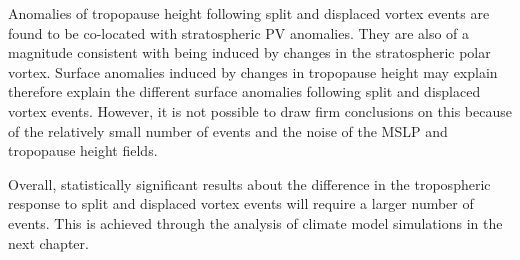 Anomalies of tropopause height following split and displaced vortex events are
found to be co-located with stratospheric PV anomalies. They are also of a
magnitude consistent with being induced by changes in the stratospheric polar
vortex. Surface anomalies induced by changes in tropopause height may explain
therefore explain the different surface anomalies following split and displaced
vortex events. However, it is not possible to draw firm conclusions on this
because of the relatively small number of events and the noise of the MSLP and
tropopause height fields.

Overall, statistically significant results about the difference in the
tropospheric response to split and displaced vortex events will require a larger
number of events. This is achieved through the analysis of climate model
simulations in the next chapter.  



















